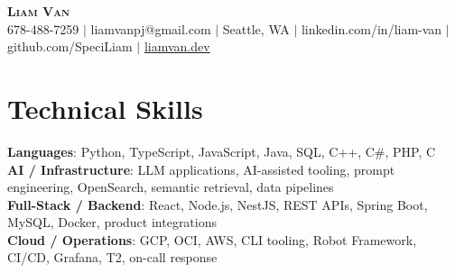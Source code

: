 \documentclass[letterpaper,11pt]{article}
\begin{document}

%
\begin{center}
    \textbf{\Huge \scshape Liam Van} \\ \vspace{1pt}
    \small 678-488-7259 $|$ \small {liamvanpj@gmail.com} $|$ Seattle, WA
 {{$|$ linkedin.com/in/liam-van} {$|$ github.com/SpeciLiam} {$|$ \href{https://liamvan.dev}{liamvan.dev}}}

\end{center}

\section{Technical Skills}
 \begin{itemize}[leftmargin=0.15in, label={}]
    \small{\item{
     \textbf{Languages}{: Python, TypeScript, JavaScript, Java, SQL, C++, C\#, PHP, C} \\
     \textbf{AI / Infrastructure}{: LLM applications, AI-assisted tooling, prompt engineering, OpenSearch, semantic retrieval, data pipelines} \\
     \textbf{Full-Stack / Backend}{: React, Node.js, NestJS, REST APIs, Spring Boot, MySQL, Docker, product integrations} \\
     \textbf{Cloud / Operations}{: GCP, OCI, AWS, CLI tooling, Robot Framework, CI/CD, Grafana, T2, on-call response} \\
    }}
 \end{itemize}
%

\end{document}
